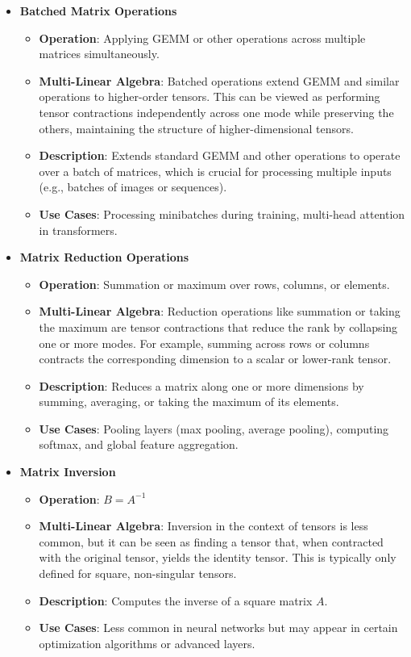 \documentclass{article}
\begin{document}
\begin{itemize}
\item \textbf{Batched Matrix Operations}
    \begin{itemize}
        \item \textbf{Operation}: Applying GEMM or other operations across multiple matrices simultaneously.
        \item \textbf{Multi-Linear Algebra}: Batched operations extend GEMM and similar operations to higher-order tensors. This can be viewed as performing tensor contractions independently across one mode while preserving the others, maintaining the structure of higher-dimensional tensors.
        \item \textbf{Description}: Extends standard GEMM and other operations to operate over a batch of matrices, which is crucial for processing multiple inputs (e.g., batches of images or sequences).
        \item \textbf{Use Cases}: Processing minibatches during training, multi-head attention in transformers.
    \end{itemize}

\item \textbf{Matrix Reduction Operations}
    \begin{itemize}
        \item \textbf{Operation}: Summation or maximum over rows, columns, or elements.
        \item \textbf{Multi-Linear Algebra}: Reduction operations like summation or taking the maximum are tensor contractions that reduce the rank by collapsing one or more modes. For example, summing across rows or columns contracts the corresponding dimension to a scalar or lower-rank tensor.
        \item \textbf{Description}: Reduces a matrix along one or more dimensions by summing, averaging, or taking the maximum of its elements.
        \item \textbf{Use Cases}: Pooling layers (max pooling, average pooling), computing softmax, and global feature aggregation.
    \end{itemize}

\item \textbf{Matrix Inversion}
    \begin{itemize}
        \item \textbf{Operation}: \( B = A^{-1} \)
        \item \textbf{Multi-Linear Algebra}: Inversion in the context of tensors is less common, but it can be seen as finding a tensor that, when contracted with the original tensor, yields the identity tensor. This is typically only defined for square, non-singular tensors.
        \item \textbf{Description}: Computes the inverse of a square matrix \(A\).
        \item \textbf{Use Cases}: Less common in neural networks but may appear in certain optimization algorithms or advanced layers.
    \end{itemize}


\end{itemize}
\end{document}

